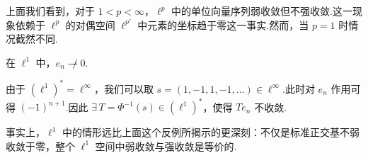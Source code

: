 上面我们看到，对于 $1 < p < \infty$，$\ell^p$ 中的单位向量序列弱收敛但不强收敛.这一现象依赖于 $\ell^p$ 的对偶空间 $\ell^{p'}$ 中元素的坐标趋于零这一事实.然而，当 $p = 1$ 时情况截然不同.

\begin{attention}
    在 $\ell^1$ 中，$e_n \not\rightharpoonup 0$.\par
    由于 $(\ell^1)^* = \ell^\infty$，我们可以取 $s = (1, -1, 1, -1, \dots) \in \ell^\infty$.此时对 $e_n$ 作用可得 $(-1)^{n+1}$.因此 $\exists\, T = \Phi^{-1}(s) \in (\ell^1)^*$，使得 $T e_n$ 不收敛.
\end{attention}

事实上，$\ell^1$ 中的情形远比上面这个反例所揭示的更深刻：不仅是标准正交基不弱收敛于零，整个 $\ell^1$ 空间中弱收敛与强收敛是等价的.


